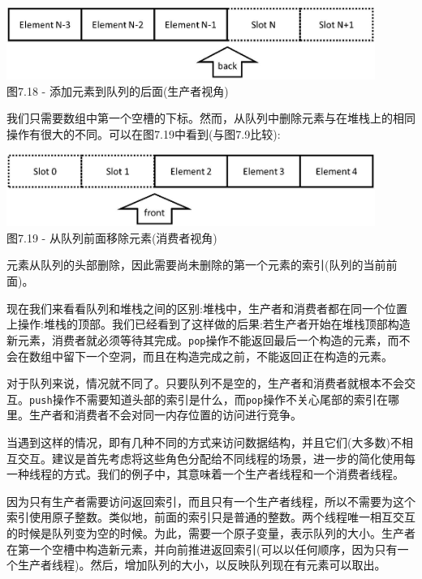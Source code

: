 \begin{center}
\includegraphics[width=0.9\textwidth]{content/2/chapter7/images/18.jpg}\\
图7.18 - 添加元素到队列的后面(生产者视角)
\end{center}

我们只需要数组中第一个空槽的下标。然而，从队列中删除元素与在堆栈上的相同操作有很大的不同。可以在图7.19中看到(与图7.9比较):

\begin{center}
\includegraphics[width=0.9\textwidth]{content/2/chapter7/images/19.jpg}\\
图7.19 - 从队列前面移除元素(消费者视角)
\end{center}

元素从队列的头部删除，因此需要尚未删除的第一个元素的索引(队列的当前前面)。

现在我们来看看队列和堆栈之间的区别:堆栈中，生产者和消费者都在同一个位置上操作:堆栈的顶部。我们已经看到了这样做的后果:若生产者开始在堆栈顶部构造新元素，消费者就必须等待其完成。\texttt{pop}操作不能返回最后一个构造的元素，而不会在数组中留下一个空洞，而且在构造完成之前，不能返回正在构造的元素。

对于队列来说，情况就不同了。只要队列不是空的，生产者和消费者就根本不会交互。\texttt{push}操作不需要知道头部的索引是什么，而\texttt{pop}操作不关心尾部的索引在哪里。生产者和消费者不会对同一内存位置的访问进行竞争。

当遇到这样的情况，即有几种不同的方式来访问数据结构，并且它们(大多数)不相互交互。建议是首先考虑将这些角色分配给不同线程的场景，进一步的简化使用每一种线程的方式。我们的例子中，其意味着一个生产者线程和一个消费者线程。 

因为只有生产者需要访问返回索引，而且只有一个生产者线程，所以不需要为这个索引使用原子整数。类似地，前面的索引只是普通的整数。两个线程唯一相互交互的时候是队列变为空的时候。为此，需要一个原子变量，表示队列的大小。生产者在第一个空槽中构造新元素，并向前推进返回索引(可以以任何顺序，因为只有一个生产者线程)。然后，增加队列的大小，以反映队列现在有元素可以取出。 

